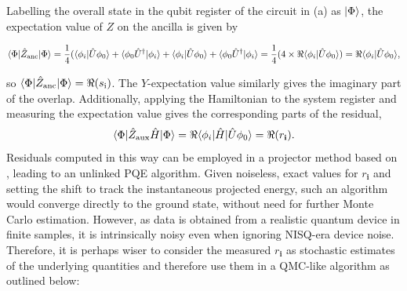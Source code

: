 \documentclass[%
 reprint,
 amsmath,amssymb,
 aps,
]{revtex4-2}
\begin{document}
Labelling the overall state in the qubit register of the circuit in  (a) as $\ket{\Phi}$, the expectation value of $Z$ on the ancilla is given by
\begin{widetext}
\begin{equation}
        \braket{\Phi|\hat Z_\mathrm{anc}|\Phi} =\frac{1}{4} (\braket{\phi_i| \hat U\phi_0} + \braket{\phi_0 \hat U^\dagger|\phi_i} + \braket{\phi_i| \hat U \phi_0} + \braket{\phi_0 \hat U^\dagger|\phi_i}
        = \frac{1}{4} (4 \times \Re{\braket{\phi_i|\hat U\phi_0}}) = \Re{\braket{\phi_i|\hat U\phi_0}},
\end{equation}
\end{widetext}
so $\braket{\Phi|\hat Z_\mathrm{anc}|\Phi} = \Re{(s_\mathrm{i})}$. The $Y$-expectation value similarly gives the imaginary part of the overlap. Additionally, applying the Hamiltonian to the system register and measuring the expectation value gives the corresponding parts of the residual,
\begin{equation}
\braket{\Phi|\hat Z_\mathrm{aux}\hat H|\Phi} = \Re{\braket{\phi_i|\hat H|\hat U\phi_0}} = \Re{(r_\mathbf{i})}.
\end{equation}
Residuals computed in this way can be employed in a projector method based on , leading to an unlinked PQE algorithm. Given noiseless, exact values for $r_\mathbf{i}$ and setting the shift to track the instantaneous projected energy, such an algorithm would converge directly to the ground state, without need for further Monte Carlo estimation. However, as data is obtained from a realistic quantum device in finite samples, it is intrinsically noisy even when ignoring NISQ-era device noise. Therefore, it is perhaps wiser to consider the measured $r_\mathbf{i}$ as stochastic estimates of the underlying quantities and therefore use them in a QMC-like algorithm as outlined below:
\end{document}
